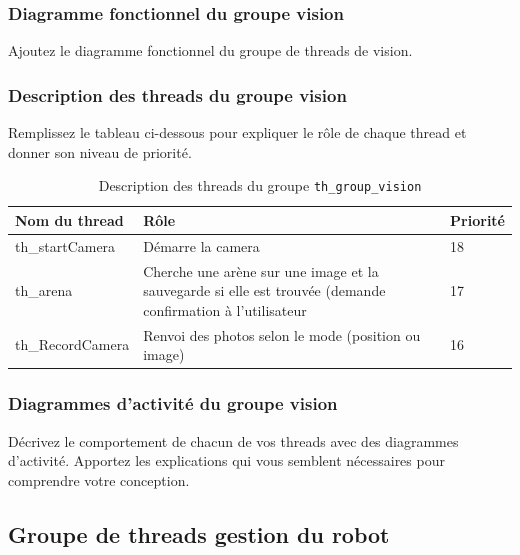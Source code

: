 \documentclass[11pt, a4paper]{paper}
\begin{document}
\subsubsection{Diagramme fonctionnel du groupe vision}

{\color{blue} Ajoutez le diagramme fonctionnel du groupe de threads de vision.}

\subsubsection{Description des threads du groupe vision}
{\color{red} Remplissez le tableau ci-dessous pour expliquer le rôle de chaque thread et donner son niveau de priorité.}


\begin{table}[htp]
\caption{Description des threads du groupe {\tt th\_group\_vision}}
\begin{center}
\begin{tabular}{|p{3cm}|p{8.5cm}|p{2cm}|}
\hline
\bf Nom du thread &	\bf Rôle &	\bf Priorité \\
\hline
\hline
\color{blue}th\_startCamera &	\color{blue}Démarre la camera &	\color{blue}18\\
\hline
\color{blue}th\_arena &	\color{blue}Cherche une arène sur une image et la sauvegarde si elle est trouvée (demande confirmation à l'utilisateur &	\color{blue}17\\
\hline
\color{blue}th\_RecordCamera &	\color{blue}Renvoi des photos selon le mode (position ou image) &	\color{blue}16\\
\hline
\end{tabular}
\end{center}
\label{tab:gt_moniteur}
\end{table}%
\FloatBarrier

\subsubsection{Diagrammes d'activité du groupe vision}
{\color{blue}Décrivez le comportement de chacun de vos threads avec des diagrammes d'activité. Apportez les explications qui vous semblent nécessaires pour comprendre votre conception.}


\subsection{Groupe de threads gestion du robot}
\end{document}
